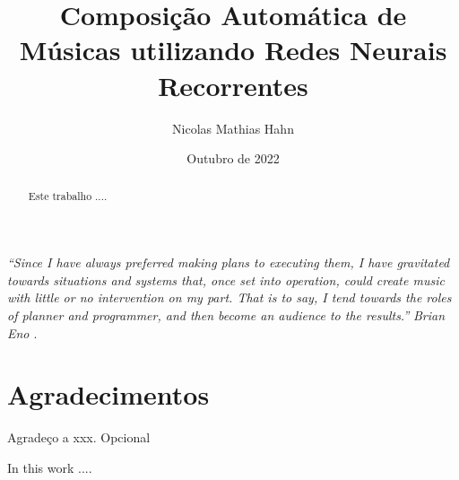 \documentclass{automatextcc}
\begin{document}
\title{Composição Automática de Músicas utilizando Redes Neurais Recorrentes}
\author{Nicolas Mathias Hahn}



\dept{\DEST}

\date{Outubro de 2022}


\maketitulo

\makefolhaderosto

\makefolhadeaprovacaoA %


\newpage
\vspace*{\fill}
\begin{flushright} %
	\textit{``Since I have always preferred making plans to executing them, I have gravitated towards situations and systems that, once set into operation, could create music with little or no intervention on my part. That is to say, I tend towards the roles of planner and programmer, and then become an audience to the results.''} \newline
	\textit{Brian Eno \citep{alpern1995}}.
\end{flushright}

\newpage
\chapter*{Agradecimentos}
Agradeço a xxx. Opcional %


\begin{abstract}
Este trabalho ....
\end{abstract}
\begin{englishabstract}
In this work ....
\end{englishabstract}

\tableofcontents
\end{document}
